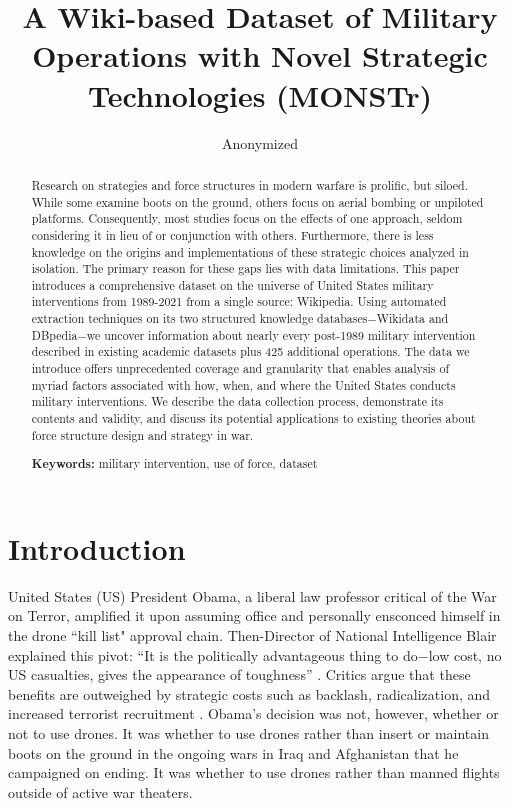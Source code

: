 \documentclass[fleqn,12pt]{article}
\title{\singlespacing A Wiki-based Dataset of Military Operations with Novel Strategic Technologies (MONSTr)}
\author{Anonymized}
\date{}
\begin{document}
	\maketitle
	\thispagestyle{empty}
	\setcounter{page}{0}
	
	\begin{abstract}
		\singlespacing \noindent Research on strategies and force structures in modern warfare is prolific, but siloed. While some examine boots on the ground, others focus on aerial bombing or unpiloted platforms. Consequently, most studies focus on the effects of one approach, seldom considering it in lieu of or conjunction with others. Furthermore, there is less knowledge on the origins and implementations of these strategic choices analyzed in isolation. The primary reason for these gaps lies with data limitations. This paper introduces a comprehensive dataset on the universe of United States military interventions from 1989-2021 from a single source: Wikipedia. Using automated extraction techniques on its two structured knowledge databases$-$Wikidata and DBpedia$-$we uncover information about nearly every post-1989 military intervention described in existing academic datasets plus 425 additional operations. The data we introduce offers unprecedented coverage and granularity that enables analysis of myriad factors associated with how, when, and where the United States conducts military interventions. We describe the data collection process, demonstrate its contents and validity, and discuss its potential applications to existing theories about force structure design and strategy in war.\\
		\vspace{.1in}
		
		\noindent
		\textbf{Keywords:} military intervention, use of force, dataset
	\end{abstract}
	
\newpage
\noindent

\section*{Introduction}
United States (US) President Obama, a liberal law professor critical of the War on Terror, amplified it upon assuming office and personally ensconced himself in the drone ``kill list" approval chain. Then-Director of National Intelligence Blair explained this pivot: ``It is the politically advantageous thing to do$-$low cost, no US casualties, gives the appearance of toughness” \citep{BeckerShane12}. Critics argue that these benefits are outweighed by strategic costs such as backlash, radicalization, and increased terrorist recruitment \citep{KilcullenExum09}. Obama's decision was not, however, whether or not to use drones. It was whether to use drones rather than insert or maintain boots on the ground in the ongoing wars in Iraq and Afghanistan that he campaigned on ending. It was whether to use drones rather than manned flights outside of active war theaters. 
	
\end{document}

